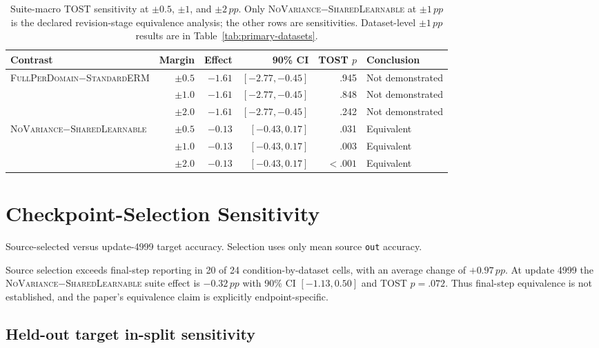 \documentclass[10pt]{article}
\newcommand{\pp}{\,pp}
\newcommand{\full}{\textsc{FullPerDomain}}
\newcommand{\erm}{\textsc{StandardERM}}
\newcommand{\shared}{\textsc{SharedLearnable}}
\newcommand{\novar}{\textsc{NoVariance}}
\begin{document}
\begin{table}[H]
\centering
\caption{Suite-macro TOST sensitivity at $\pm0.5$, $\pm1$, and $\pm2\pp$.
Only \novar{}$-$\shared{} at $\pm1\pp$ is the declared revision-stage equivalence
analysis; the other rows are sensitivities. Dataset-level $\pm1\pp$ results
are in Table~\ref{tab:primary-datasets}.}
\label{tab:equivalence-sensitivity}
\small
\begin{tabular}{lrrrrl}
\toprule
Contrast & Margin & Effect & 90\% CI & TOST $p$ & Conclusion \\
\midrule
\full{}$-$\erm{} & $\pm0.5$ & $-1.61$ & $[-2.77,-0.45]$ & .945 & Not demonstrated \\
 & $\pm1.0$ & $-1.61$ & $[-2.77,-0.45]$ & .848 & Not demonstrated \\
 & $\pm2.0$ & $-1.61$ & $[-2.77,-0.45]$ & .242 & Not demonstrated \\
\midrule
\novar{}$-$\shared{} & $\pm0.5$ & $-0.13$ & $[-0.43,0.17]$ & .031 & Equivalent \\
 & $\pm1.0$ & $-0.13$ & $[-0.43,0.17]$ & .003 & Equivalent \\
 & $\pm2.0$ & $-0.13$ & $[-0.43,0.17]$ & $<.001$ & Equivalent \\
\bottomrule
\end{tabular}
\end{table}

\section{Checkpoint-Selection Sensitivity}
\label{sec:checkpoint}

\begin{table}[H]
\centering
\caption{Source-selected versus update-4999 target accuracy. Selection uses
only mean source \texttt{out} accuracy.}
\label{tab:checkpoint-sensitivity}
\scriptsize
\resizebox{\textwidth}{!}{%
}
\end{table}

Source selection exceeds final-step reporting in 20 of 24
condition-by-dataset cells, with an average change of $+0.97\pp$. At update
4999 the \novar{}$-$\shared{} suite effect is $-0.32\pp$ with 90\% CI
$[-1.13,0.50]$ and TOST $p=.072$. Thus final-step equivalence is not
established, and the paper's equivalence claim is explicitly endpoint-specific.

\subsection{Held-out target in-split sensitivity}
\end{document}
